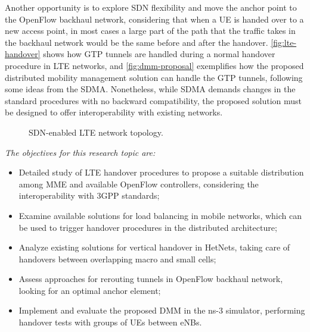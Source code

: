 Another opportunity is to explore \ac{SDN} flexibility and move the anchor
point to the OpenFlow backhaul network, considering that when a \ac{UE} is
handed over to a new access point, in most cases a large part of the path that
the traffic takes in the backhaul network would be the same before and after
the handover. \autoref{fig:lte-handover} shows how \ac{GTP} tunnels are handled
during a normal handover procedure in \ac{LTE} networks, and
\autoref{fig:dmm-proposal} exemplifies how the proposed distributed mobility
management solution can handle the \ac{GTP} tunnels, following some ideas from
the \ac{SDMA}. Nonetheless, while \ac{SDMA} demands changes in the standard
procedures with no backward compatibility, the proposed solution must be
designed to offer interoperability with existing networks.

\begin{figure}[htb]
  \centering
  \hfil \hspace{1cm}
  \caption{\acs{SDN}-enabled \acs{LTE} network topology.}
  \label{fig:dmm}
\end{figure}

\emph{The objectives for this research topic are:}
\begin{itemize}
  \item Detailed study of \ac{LTE} handover procedures to propose a suitable
  distribution among \ac{MME} and available OpenFlow controllers, considering
  the interoperability with \ac{3GPP} standards;

  \item Examine available solutions for load balancing in mobile networks,
  which can be used to trigger handover procedures in the distributed
  architecture;

  \item Analyze existing solutions for vertical handover in \acp{HetNet},
  taking care of handovers between overlapping macro and small cells;

  \item Assess approaches for rerouting tunnels in OpenFlow backhaul network,
  looking for an optimal anchor element;

  \item Implement and evaluate the proposed \ac{DMM} in the \ac{ns-3}
  simulator, performing handover tests with groups of \acp{UE} between
  \acp{eNB}.
\end{itemize}


